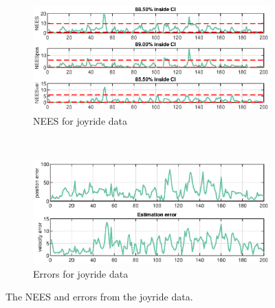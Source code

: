 \begin{figure}[ht]
    \centering
	\begin{subfigure}[h]{0.4\textwidth}
		\includegraphics[width=\textwidth]{figures/ga_1/joyride_NEES}
		\caption{NEES for joyride data}
		\label{fig:ga_1_joyride_NEES}
    \end{subfigure}%
    ~
    \begin{subfigure}[h]{0.4\textwidth}
        \includegraphics[width=\textwidth]{figures/ga_1/joyride_error}
        \caption{Errors for joyride data}
        \label{fig:ga_1_joyride_error}
    \end{subfigure}
    \caption{The NEES and errors from the joyride data. }
    \label{fig:ga_1_joyride_NEES_and_error} 
\end{figure}





